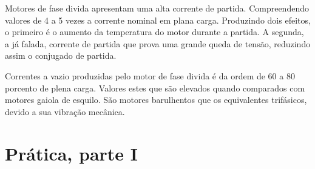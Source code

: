 \documentclass[paper=a4, fontsize=11pt]{article}
\begin{document}
Motores de fase divida apresentam uma alta corrente de partida. 
Compreendendo valores de 4 a 5 vezes a corrente nominal em plana
carga. Produzindo dois efeitos, o primeiro é o aumento da temperatura
do motor durante a partida. A segunda, a já falada, corrente de partida
que prova uma grande queda de tensão, reduzindo assim o conjugado
de partida. 

Correntes a vazio produzidas pelo motor de fase divida é 
da ordem de 60 a 80 porcento de plena carga. Valores estes que 
são elevados quando comparados com motores gaiola de esquilo. São
motores barulhentos que os equivalentes trifásicos, devido
a sua vibração mecânica.

\section{Prática, parte I}
\end{document}
